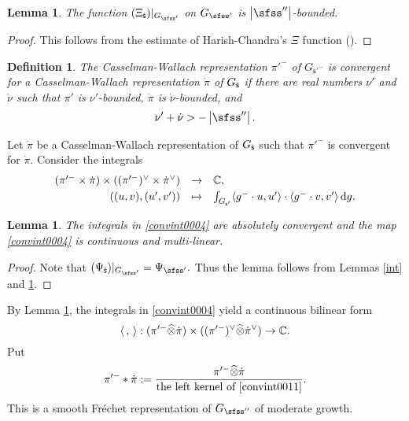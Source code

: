 \documentclass[12pt,a4paper]{amsart}
\def\abs#1{\left|{#1}\right|}
\newcommand{\od}{\operatorname{d}}
\newcommand{\la}{\langle}
\newcommand{\ra}{\rangle}
\newcommand{\be}{\begin {equation}}
\newcommand{\ee}{\end {equation}}
\numberwithin{equation}{section}
\newtheorem{lem}[thm]{Lemma}
\newtheorem{defn}[thm]{Definition}
\theoremstyle{remark}
\begin{document}
\begin{lem}\label{boundxx}
The function $(\Xi_\dsfss)|_{G_{\sfss'}}$ on $G_{\sfss'}$  is   $\abs{\sfss''}$-bounded.
\end{lem}
\begin{proof}
This follows from the  estimate of Harish-Chandra's $\Xi$ function (\cite[Theorem 4.5.3]{Wa1}).
\end{proof}


 \begin{defn}\label{defn:CR33}
The Casselman-Wallach representation  $\pi'^-$ of $G_{\mathsf s'^-}$ is convergent  for a Casselman-Wallach representation  $\dot \pi$ of $G_{{\dot{\mathsf s}}}$ if there are real numbers $\nu'$ and $\dot \nu$ such that $\pi'$ is $\nu'$-bounded, $\dot \pi$ is $\dot \nu$-bounded, and
\[
  \nu'+\dot \nu>-\abs{\sfss''}.
\]
\end{defn}

Let $\dot \pi$  be a Casselman-Wallach representation of $G_{{\dot{\mathsf s}}}$ such that $\pi'^-$  is convergent  for  $\dot \pi$.
Consider the integrals
\be\label{convint0004}
\begin{array}{rcl}
 (\pi'^- \times \dot \pi)\times ((\pi'^-)^\vee \times \dot \pi^\vee )&\rightarrow &\C, \smallskip \\
   ((u,v),(u',v')) &\mapsto &\int_{G_{\mathsf s'}} \la g^-\cdot u, u'\ra\cdot \la g^-\cdot v, v'\ra \od\! g.
   \end{array}
 \ee

\begin{lem}\label{intpi0004}
The integrals in \eqref{convint0004} are absolutely convergent and the map \eqref{convint0004} is   continuous and multi-linear.
\end{lem}
\begin{proof}
Note that
$
  (\Psi_{\dsfss})|_{G_{\sfss'}}=\Psi_{\sfss'}.
$
Thus the lemma follows from Lemmas \ref{int} and \ref{boundxx}.
\end{proof}



By Lemma \ref{intpi0004}, the integrals in \eqref{convint0004} yield a continuous bilinear form
\be\label{convint0011}
 \la\,,\,\ra: (\pi'^- \widehat \otimes{ \dot \pi})\times ((\pi'^-)^\vee \widehat \otimes {\dot \pi}^\vee )\rightarrow \C.
 \ee
Put
\begin{equation}\label{thetab0}
 \pi'^-*\dot \pi:=\frac{\pi'^-\widehat \otimes \dot \pi}{\textrm{the left kernel of \eqref{convint0011}}}.
\end{equation}
This is a smooth Fr\'echet representation of $G_{\sfss''}$ of moderate growth.
\end{document}
